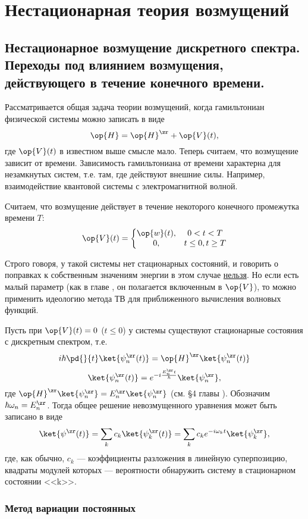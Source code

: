 \chapter{Нестационарная теория возмущений}

\section{Нестационарное возмущение дискретного спектра. Переходы под влиянием возмущения, действующего в течение конечного времени.}

Рассматривается общая задача теории возмущений, когда гамильтониан физической системы можно записать в виде
$$
\op{H} = \op{H}^\zr + \op{V}(t),
$$
где $\op{V}(t)$ в известном выше смысле мало. Теперь считаем, что возмущение зависит от времени. Зависимость гамильтониана от времени характерна для незамкнутых систем, т.е. там, где действуют внешние силы. Например, взаимодействие квантовой системы с электромагнитной волной.

Считаем, что возмущение действует в течение некоторого конечного промежутка времени $T$:
$$
\op{V}(t) = \left \{ 
  \begin{matrix}
    \op{w}(t), &  0 < t < T \\
    0, & t \le 0, t \ge T
  \end{matrix}
  \right .
$$

Строго говоря, у такой системы нет стационарных состояний, и говорить о поправках к собственным значениям энергии в этом случае \underline{нельзя}. Но если есть малый параметр (как в главе , он полагается включенным в $\op{V}$), то можно применить идеологию метода ТВ для приближенного вычисления волновых функций.

Пусть при $\op{V}(t) = 0$ ($t \le 0$) у системы существуют стационарные состояния с дискретным спектром, т.е.
$$
i \hbar \pd{}{t} \ket{\psi_n^\zr(t)} = \op{H}^\zr \ket{\psi_n^\zr(t)} 
$$
$$
\ket{\psi_n^\zr (t)} = e^{-i \frac{E_n^\zr t}{\hbar}} \ket{\psi_n^\zr},
$$
где $\op{H}^\zr \ket{\psi_n^\zr} = E_n^\zr \ket{\psi_n^\zr}$ (см. \S 4 главы ). Обозначим $\hbar \omega_n = E_n^\zr$. Тогда общее решение невозмущенного уравнения может быть записано в виде
$$
\ket{\psi^\zr(t)} = \sum_k c_k \ket{\psi_k^\zr (t)} = \sum_k c_k e^{-i \omega_k t} \ket{\psi_k^\zr},
$$
где, как обычно, $c_k$ --- коэффициенты разложения в линейную суперпозицию, квадраты модулей которых --- вероятности обнаружить систему в стационарном состоянии <<k>>.

\subsection{Метод вариации постоянных}

